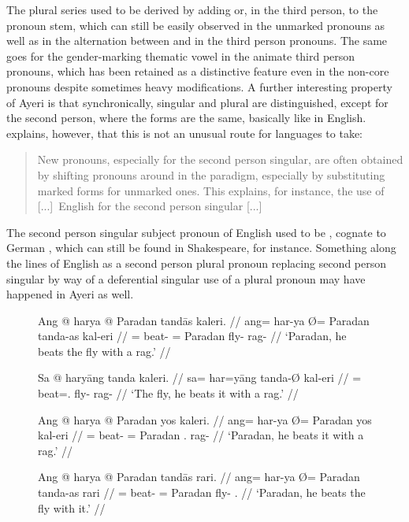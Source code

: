 The plural series used to be derived by adding  or, in the third 
person,  to the pronoun stem, which can still be easily 
observed in the unmarked pronouns as well as in the alternation between 
 and  in the third person pronouns. The same goes 
for the gender-marking thematic vowel in the animate third person pronouns, 
which has been retained as a distinctive feature even in the non-core pronouns 
despite sometimes heavy modifications. A further interesting property of Ayeri 
is that synchronically, singular and plural are distinguished, except for the 
second person, where the forms are the same, basically like in English. 
\citet{lehmann2015} explains, however, that this is not an unusual route for 
languages to take:

\blockcquote[42]{lehmann2015}{New pronouns, especially for the second person 
singular, are often obtained by shifting pronouns around in the paradigm,
especially by substituting marked forms for unmarked ones. This explains, for
instance, the use of [...]\ English  for the second person singular
[...]}

The second person singular subject pronoun of English used to be , 
cognate to German , which can still be found in Shakespeare, for 
instance. Something along the lines of English  as a second 
person plural pronoun replacing second person singular  by way of a 
deferential singular use of a plural pronoun \citep[you, pron., adj., and 
n.]{oed} may have happened in Ayeri as well.

\begin{figure}[h]
\pex\label{ex:perspro}
\a\label{ex:pronfull}\begingl
	\gla Ang @ harya {} @ Paradan tandās kaleri. //
	\glb ang= har-ya Ø= Paradan tanda-as kal-eri //
	\glc \AgtT{}= beat-\TsgM{} \Top{}= Paradan fly-\Parg{} rag-\Ins{} //
	\glft `Paradan, he beats the fly with a rag.' //
\endgl

\a\label{ex:pronagt}\begingl
	\gla Sa @ haryāng tanda kaleri. //
	\glb sa= har=yāng tanda-Ø kal-eri //
	\glc \PatT{}= beat=\TsgM{}.\Aarg{} fly-\Top{} rag-\Ins{} //
	\glft `The fly, he beats it with a rag.' //
\endgl

\a\label{ex:pronpat}\begingl
	\gla Ang @ harya {} @ Paradan yos kaleri. //
	\glb ang= har-ya Ø= Paradan yos kal-eri //
	\glc \AgtT{}= beat-\TsgM{} \Top{}= Paradan \TsgN{}.\Parg{} rag-\Ins{} //
	\glft `Paradan, he beats it with a rag.' //
\endgl

\a\label{ex:pronins}\begingl
	\gla Ang @ harya {} @ Paradan tandās rari. //
	\glb ang= har-ya Ø= Paradan tanda-as rari //
	\glc \AgtT{}= beat-\TsgM{} \Top{}= Paradan fly-\Parg{} \TsgI{}.\Ins{} //
	\glft `Paradan, he beats the fly with it.' //
\endgl
\xe
\end{figure}


